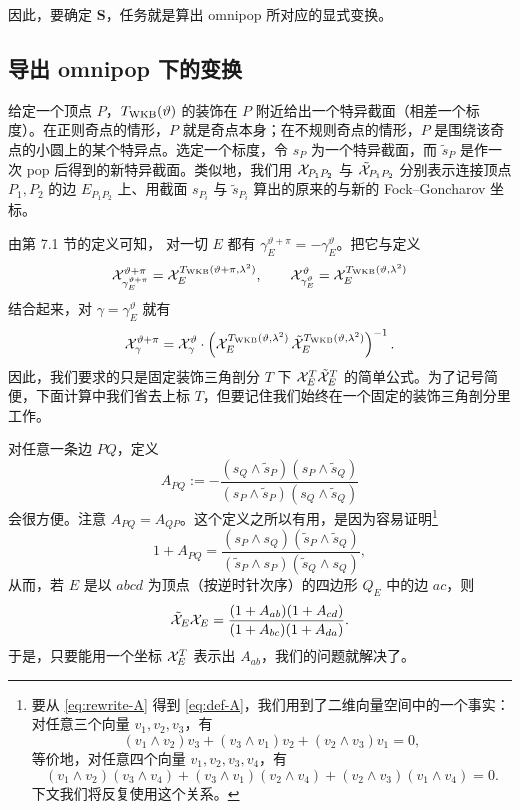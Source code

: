 因此，要确定 $\mathbf S$，任务就是算出 omnipop 所对应的显式变换。

\subsection{导出 omnipop 下的变换}\label{subsec:SuperPop}

给定一个顶点 $P$，$T_{\rm WKB}(\vartheta)$ 的装饰在 $P$ 附近给出一个特异截面（相差一个标度）。在正则奇点的情形，$P$ 就是奇点本身；在不规则奇点的情形，$P$ 是围绕该奇点的小圆上的某个特异点。选定一个标度，令 $s_P$ 为一个特异截面，而 $\tilde s_P$ 是作一次 pop 后得到的新特异截面。类似地，我们用 $\mathcal{X}_{P_1P_2}$ 与 $\tilde{\mathcal{X}}_{P_1P_2}$ 分别表示连接顶点 $P_1,P_2$ 的边 $E_{P_1P_2}$ 上、用截面 $s_{P_i}$ 与 $\tilde s_{P_i}$ 算出的原来的与新的 Fock--Goncharov 坐标。

由第 7.1 节的定义可知，%
对一切 $E$ 都有 $\gamma^{\vartheta+\pi}_E=-\gamma^{\vartheta}_E$。把它与定义
\begin{equation}
\mathcal{X}_{\gamma^{\vartheta+\pi}_E}^{\vartheta+\pi}=\mathcal{X}^{T_{\rm WKB}(\vartheta+\pi,\lambda^2)}_E,\qquad
\mathcal{X}_{\gamma^{\vartheta}_E}^{\vartheta}=\mathcal{X}^{T_{\rm WKB}(\vartheta,\lambda^2)}_E
\end{equation}
结合起来，对 $\gamma=\gamma^{\vartheta}_E$ 就有
\begin{equation}\label{eq:X-to-tildeX}
\mathcal{X}^{\vartheta+\pi}_\gamma=\mathcal{X}^{\vartheta}_\gamma\cdot\left(\mathcal{X}_E^{T_{\rm WKB}(\vartheta,\lambda^2)}\,\tilde{\mathcal{X}}_E^{T_{\rm WKB}(\vartheta,\lambda^2)}\right)^{-1}.
\end{equation}
因此，我们要求的只是固定装饰三角剖分 $T$ 下 $\mathcal{X}_E^T\tilde{\mathcal{X}}_E^T$ 的简单公式。为了记号简便，下面计算中我们省去上标 $T$，但要记住我们始终在一个固定的装饰三角剖分里工作。

对任意一条边 $PQ$，定义
\begin{equation}\label{eq:rewrite-A}
A_{PQ}:=-\frac{(s_Q\wedge\tilde s_P)(s_P\wedge\tilde s_Q)}{(s_P\wedge\tilde s_P)(s_Q\wedge\tilde s_Q)}
\end{equation}
会很方便。注意 $A_{PQ}=A_{QP}$。这个定义之所以有用，是因为容易证明\footnote{要从 \eqref{eq:rewrite-A} 得到 \eqref{eq:def-A}，我们用到了二维向量空间中的一个事实：对任意三个向量 $v_1,v_2,v_3$，有
\begin{equation}\label{eq:3-termIdent}
(v_1\wedge v_2)v_3+(v_3\wedge v_1)v_2+(v_2\wedge v_3)v_1=0,
\end{equation}
等价地，对任意四个向量 $v_1,v_2,v_3,v_4$，有
\begin{equation}
(v_1\wedge v_2)(v_3\wedge v_4)+(v_3\wedge v_1)(v_2\wedge v_4)+(v_2\wedge v_3)(v_1\wedge v_4)=0.
\end{equation}
下文我们将反复使用这个关系。}
\begin{equation}\label{eq:def-A}
1+A_{PQ}=\frac{(s_P\wedge s_Q)(\tilde s_P\wedge\tilde s_Q)}{(\tilde s_P\wedge s_P)(\tilde s_Q\wedge s_Q)},
\end{equation}
从而，若 $E$ 是以 $abcd$ 为顶点（按逆时针次序）的四边形 $Q_E$ 中的边 $ac$，则
\begin{equation}\label{eq:X-times-tildeX}
\tilde{\mathcal{X}}_E\mathcal{X}_E=\frac{(1+A_{ab})(1+A_{cd})}{(1+A_{bc})(1+A_{da})}.
\end{equation}
于是，只要能用一个坐标 $\mathcal{X}^T_E$ 表示出 $A_{ab}$，我们的问题就解决了。

